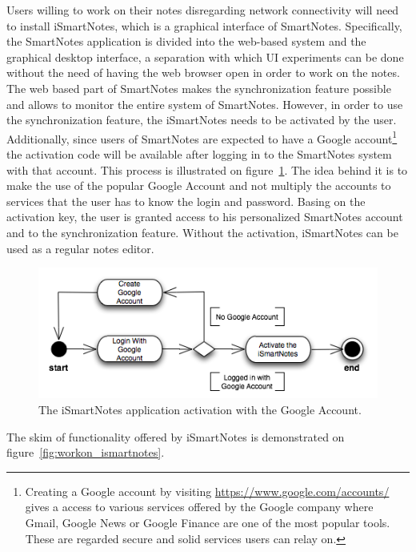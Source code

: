 Users willing to work on their notes disregarding network connectivity will need to install iSmartNotes, which is a graphical interface of SmartNotes. Specifically, the SmartNotes application is divided into the web-based system and the graphical desktop interface, a separation with which UI experiments can be done without the need of having the web browser open in order to work on the notes. The web based part of SmartNotes makes the synchronization feature possible and allows to monitor the entire system of SmartNotes. However, in order to use the synchronization feature, the iSmartNotes needs to be activated by the user. Additionally, since users of SmartNotes are expected to have a Google account\footnote{Creating a Google account by visiting \url{https://www.google.com/accounts/} gives a access to various services offered by the Google company where Gmail, Google News or Google Finance are one of the most popular tools. These are regarded secure and solid services users can relay on.} the activation code will be available after logging in to the SmartNotes system with that account. This process is illustrated on figure~\ref{fig:ismartnotes_activation}. The idea behind it is to make the use of the popular Google Account and not multiply the accounts to services that the user has to know the login and password. Basing on the activation key, the user is granted access to his personalized SmartNotes account and to the synchronization feature. Without the activation, iSmartNotes can be used as a regular notes editor.  
\begin{figure}[ht]
\begin{center}
\includegraphics[scale=0.65]{charts/activate_iSmartNotes.png}
\caption{The iSmartNotes application activation with the Google Account.}
\label{fig:ismartnotes_activation}
\end{center}
\end{figure}
The skim of functionality offered by iSmartNotes is demonstrated on figure~\ref{fig:workon_ismartnotes}.
